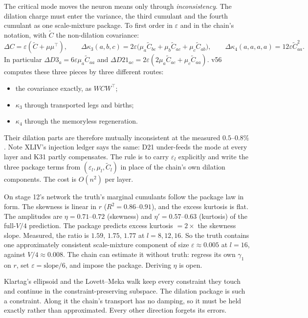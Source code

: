 \begin{corollary}\label{cor:package}
The critical mode moves the neuron means only through \emph{inconsistency}. The dilation charge must enter the variance, the third
cumulant and the fourth cumulant as one scale-mixture package. To first order in $\varepsilon$ and in the chain's notation, with
$\widetilde C$ the non-dilation covariance:
\[
\Delta C=\varepsilon(\widetilde C+\mu\mu^\top),\qquad \Delta\kappa_3(a,b,c)=2\varepsilon\big(\mu_a\widetilde C_{bc}+\mu_b\widetilde C_{ac}+\mu_c\widetilde C_{ab}\big),\qquad
\Delta\kappa_4(a,a,a,a)=12\varepsilon\widetilde C_{aa}^2 .
\]
In particular $\Delta D3_a=6\varepsilon\mu_a\widetilde C_{aa}$ and $\Delta D21_{ac}=2\varepsilon(2\mu_a\widetilde C_{ac}+\mu_c\widetilde C_{aa})$. v56 computes these
three pieces by three different routes:
\begin{itemize}[leftmargin=*]
\item the covariance exactly, as $WCW^\top$;
\item $\kappa_3$ through transported legs and births;
\item $\kappa_4$ through the memoryless regeneration.
\end{itemize}
Their dilation parts are therefore mutually inconsistent at the measured $0.5$--$0.8\%$. Note XLIV's injection ledger says the same:
D21 under-feeds the mode at every layer and K31 partly compensates. The rule is to carry $\varepsilon_l$ explicitly and write the three
package terms from $(\varepsilon_l,\mu_l,\widetilde C_l)$ in place of the chain's own dilation components. The cost is $O(n^2)$ per layer.
\end{corollary}
\begin{remark}
On stage 12's network the truth's marginal cumulants follow the package law in form. The skewness is linear in $r$ ($R^2=0.86$--$0.91$),
and the excess kurtosis is flat. The amplitudes are $\eta=0.71$--$0.72$ (skewness) and $\eta'=0.57$--$0.63$ (kurtosis) of the
full-$V/4$ prediction. The package predicts excess kurtosis $=2\times$ the skewness slope. Measured, the ratio is $1.59$, $1.75$, $1.77$ at
$l=8,12,16$. So the truth contains one approximately consistent scale-mixture component of size $\varepsilon\approx0.005$ at $l=16$, against
$V/4\approx0.008$. The chain can estimate it without truth: regress its own $\gamma_1$ on $r$, set $\varepsilon=\text{slope}/6$, and impose the
package. Deriving $\eta$ is open.
\end{remark}
\begin{remark}
Klartag's ellipsoid and the Lovett--Meka walk keep every constraint they touch and continue in the constraint-preserving subspace.
The dilation package is such a constraint. Along it the chain's transport has no damping, so it must be held exactly rather than
approximated. Every other direction forgets its errors.
\end{remark}
